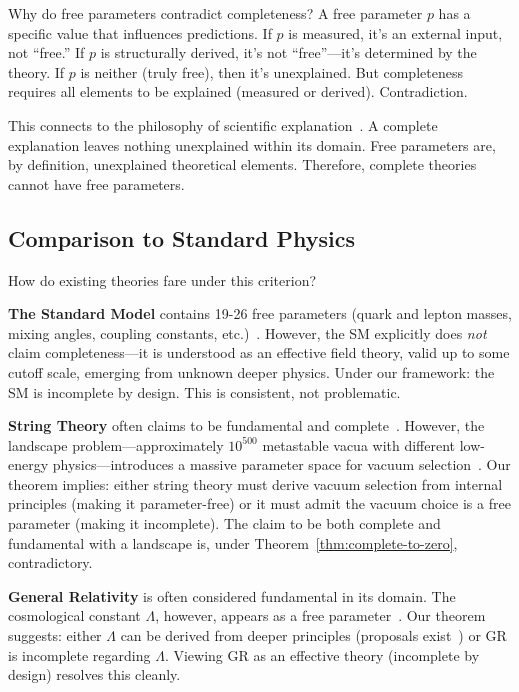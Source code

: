 \documentclass[12pt]{article}
\theoremstyle{remark}
\begin{document}
Why do free parameters contradict completeness? A free parameter $p$ has a specific value that influences predictions. If $p$ is measured, it's an external input, not ``free.'' If $p$ is structurally derived, it's not ``free''---it's determined by the theory. If $p$ is neither (truly free), then it's unexplained. But completeness requires all elements to be explained (measured or derived). Contradiction.

This connects to the philosophy of scientific explanation~\cite{Salmon1989,Woodward2003}. A complete explanation leaves nothing unexplained within its domain. Free parameters are, by definition, unexplained theoretical elements. Therefore, complete theories cannot have free parameters.

\subsection{Comparison to Standard Physics}

How do existing theories fare under this criterion?

\textbf{The Standard Model} contains 19-26 free parameters (quark and lepton masses, mixing angles, coupling constants, etc.)~\cite{PDG2024}. However, the SM explicitly does \emph{not} claim completeness---it is understood as an effective field theory, valid up to some cutoff scale, emerging from unknown deeper physics. Under our framework: the SM is incomplete by design. This is consistent, not problematic.

\textbf{String Theory} often claims to be fundamental and complete~\cite{Polchinski1998,Becker2007}. However, the landscape problem---approximately $10^{500}$ metastable vacua with different low-energy physics---introduces a massive parameter space for vacuum selection~\cite{Susskind2003,Douglas2003}. Our theorem implies: either string theory must derive vacuum selection from internal principles (making it parameter-free) or it must admit the vacuum choice is a free parameter (making it incomplete). The claim to be both complete and fundamental with a landscape is, under Theorem~\ref{thm:complete-to-zero}, contradictory.

\textbf{General Relativity} is often considered fundamental in its domain. The cosmological constant $\Lambda$, however, appears as a free parameter~\cite{Weinberg1989}. Our theorem suggests: either $\Lambda$ can be derived from deeper principles (proposals exist~\cite{Holographic2023}) or GR is incomplete regarding $\Lambda$. Viewing GR as an effective theory (incomplete by design) resolves this cleanly.
\end{document}

